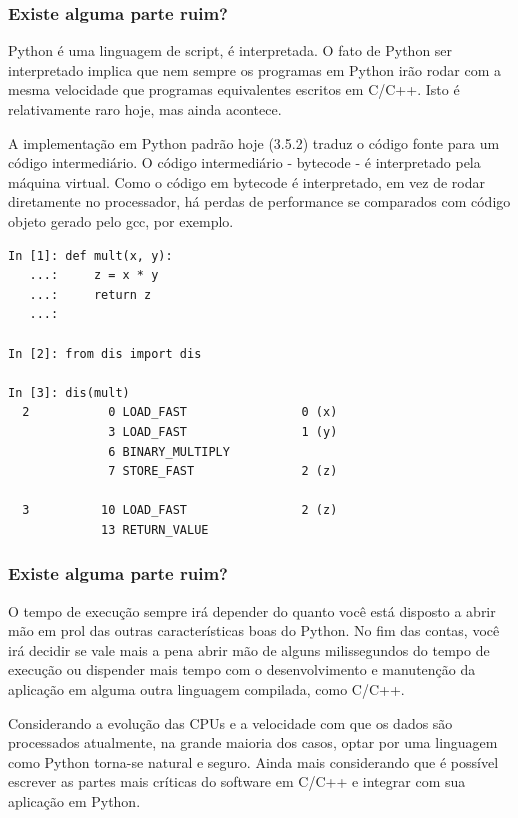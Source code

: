 \documentclass[aspectratio=169]{beamer}
\begin{document}
\begin{frame}
    \frametitle{Existe alguma parte ruim?}
    Python é uma linguagem de script, é interpretada. O fato de Python ser interpretado
implica que nem sempre os programas em Python irão rodar com a mesma velocidade que programas
equivalentes escritos em C/C++. Isto é relativamente raro hoje, mas ainda acontece.

    A implementação em Python padrão hoje (3.5.2) traduz o código fonte para um código
intermediário. O código intermediário - bytecode - é interpretado pela máquina virtual. Como
o código em bytecode é interpretado, em vez de rodar diretamente no processador, há perdas
de performance se comparados com código objeto gerado pelo gcc, por exemplo.
\end{frame}

\begin{frame}[fragile]
    \begin{lstlisting}
In [1]: def mult(x, y):
   ...:     z = x * y
   ...:     return z
   ...:

In [2]: from dis import dis

In [3]: dis(mult)
  2           0 LOAD_FAST                0 (x)
              3 LOAD_FAST                1 (y)
              6 BINARY_MULTIPLY
              7 STORE_FAST               2 (z)

  3          10 LOAD_FAST                2 (z)
             13 RETURN_VALUE
    \end{lstlisting}
\end{frame}

\begin{frame}
    \frametitle{Existe alguma parte ruim?}
    O tempo de execução sempre irá depender do quanto você está disposto a abrir mão
em prol das outras características boas do Python. No fim das contas, você irá decidir
se vale mais a pena abrir mão de alguns milissegundos do tempo de execução ou dispender
mais tempo com o desenvolvimento e manutenção da aplicação em alguma outra linguagem
compilada, como C/C++.

    Considerando a evolução das CPUs e a velocidade com que os dados são processados
atualmente, na grande maioria dos casos, optar por uma linguagem como Python torna-se
natural e seguro. Ainda mais considerando que é possível escrever as partes mais críticas
do software em C/C++ e integrar com sua aplicação em Python.
\end{frame}
\end{document}
